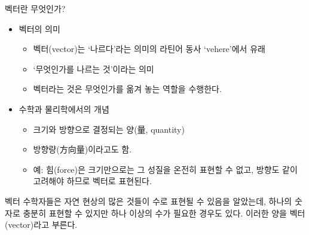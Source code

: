 \begin{frame}{벡터란 무엇인가?}
\begin{itemize}
\item 벡터의 의미
  \begin{itemize}
  \item 벡터(vector)는 ‘나르다’라는 의미의 라틴어 동사 ‘vehere'에서 유래
  \item ‘무엇인가를 나르는 것’이라는 의미
  \item 벡터라는 것은 무엇인가를 옮겨 놓는 역할을 수행한다.
  \end{itemize}
\end{itemize}

\begin{itemize}
\item 수학과 물리학에서의 개념
  \begin{itemize}
  \item 크기와 방향으로 결정되는 양(量, quantity)
  \item 방향량(方向量)이라고도  함.
  \item 예: 힘(force)은 크기만으로는 그 성질을 온전히 표현할 수 없고, 방향도 같이 고려해야 하므로 벡터로 표현된다.
  \end{itemize}
\end{itemize}

\begin{block}{벡터}
수학자들은 자연 현상의 많은 것들이 수로 표현될 수 있음을 알았는데, 하나의 숫자로 충분히 표현할 수 있지만 하나 이상의 수가 필요한 경우도 있다. 
이러한 양을 벡터(vector)라고 부른다.
\end{block}

\end{frame}



